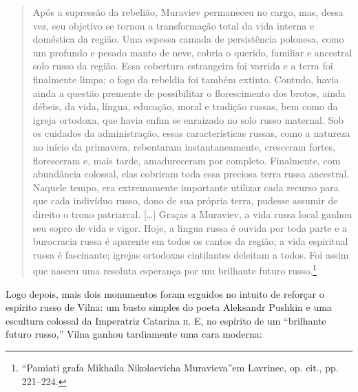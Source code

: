 \begin{quote}
Após a supressão da rebelião, Muraviev permaneceu no cargo, mas, dessa
vez, seu objetivo se tornou a transformação total da vida interna e
doméstica da região. Uma espessa camada de persistência polonesa, como
um profundo e pesado manto de neve, cobria o querido, familiar e
ancestral solo russo da região. Essa cobertura estrangeira foi varrida e
a terra foi finalmente limpa; o fogo da rebeldia foi também extinto.
Contudo, havia ainda a questão premente de possibilitar o florescimento
dos brotos, ainda débeis, da vida, língua, educação, moral e tradição
russas, bem como da igreja ortodoxa, que havia enfim se enraizado no
solo russo maternal. Sob os cuidados da administração, essas
características russas, como a natureza no início da primavera,
rebentaram instantaneamente, cresceram fortes, floresceram e, mais
tarde, amadureceram por completo. Finalmente, com abundância colossal,
elas cobriram toda essa preciosa terra russa ancestral. Naquele tempo,
era extremamente importante utilizar cada recurso para que cada
indivíduo russo, dono de sua própria terra, pudesse assumir de direito o
trono patriarcal. [\ldots{}] Graças a Muraviev, a vida russa local ganhou
seu sopro de vida e vigor. Hoje, a língua russa é ouvida por toda parte
e a burocracia russa é aparente em todos os cantos da região; a vida
espiritual russa é fascinante; igrejas ortodoxas cintilantes deleitam a
todos. Foi assim que nasceu uma resoluta esperança por um brilhante
futuro russo.\footnote{``Pamiati grafa Mikhaila Nikolaevicha Muravieva''em Lavrinec, op. cit., pp. 221--224.} 
\end{quote}

Logo depois, mais dois monumentos foram erguidos no intuito de reforçar
o espírito russo de Vilna: um busto simples do poeta Aleksandr Pushkin e
uma escultura colossal da Imperatriz Catarina \textsc{ii}. E, no espírito de um
``brilhante futuro russo,'' Vilna ganhou tardiamente uma cara moderna:

